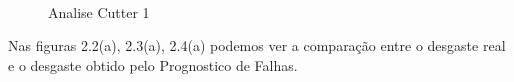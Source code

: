 \begin{figure}[h]
  \centering
  \mbox{%
    \qquad
    }
  \caption{Analise Cutter 1 \cite{inacioprognostico}}
  \label{avr-memmap}
\end{figure}


Nas figuras 2.2(a), 2.3(a), 2.4(a) podemos ver a comparação entre o desgaste real e o desgaste obtido pelo Prognostico de Falhas.


